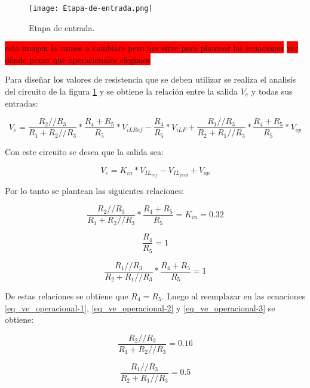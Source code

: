 \begin{figure}[H]
	\centering
	\texttt{[image: Etapa-de-entrada.png]}
	\caption{Etapa de entrada.}
	\label{fig:img_etapa-de-entrada}
\end{figure}
\colorbox{red}{esta imagen la vamos a cambiare pero nos sirve para plantear las ecuaciones}
\colorbox{red}{ver dónde poner qué operacionales elegimos}

Para diseñar los valores de resistencia que se deben utilizar se realiza el analisis del circuito de la figura \ref{fig:img_etapa-de-entrada} y se obtiene la relación entre la salida $V_e$ y todas sus entradas:

\begin{equation*}
	V_e = \frac{R_{2}//R_{3}}{R_{1}+R_{2}//R_{3}}*\frac{R_{4}+R_{5}}{R_{5}}*V_{iLRef}-\frac{R_{4}}{R_{5}}*V_{iLF}+\frac{R_{1}//R_{3}}{R_{2}+R_{1}//R_{3}}*\frac{R_{4}+R_{5}}{R_{5}}* V_{op}
\end{equation*}

Con este circuito se desea que la salida sea:

\begin{equation}
	V_e = K_{in} * V_{IL_{ref}} - V_{IL_{feed}} + V_{op}
\end{equation}

Por lo tanto se plantean las siguientes relaciones:

\begin{equation} \label{eq_ve_operacional-1}
	\frac{R_{2}//R_{3}}{R_{1}+R_{2}//R_{3}}*\frac{R_{4}+R_{5}}{R_{5}} = K_{in} = 0.32
\end{equation}

\begin{equation} \label{eq_ve_operacional-2}
	\frac{R_{4}}{R_{5}} = 1
\end{equation}

\begin{equation} \label{eq_ve_operacional-3}
	\frac{R_{1}//R_{3}}{R_{2}+R_{1}//R_{3}}*\frac{R_{4}+R_{5}}{R_{5}} = 1
\end{equation}

De estas relaciones se obtiene que $R_{4}=R_{5}$. Luego al reemplazar en las ecuaciones \ref{eq_ve_operacional-1}, \ref{eq_ve_operacional-2} y \ref{eq_ve_operacional-3} se obtiene:

\begin{equation*}
	\frac{R_{2}//R_{3}}{R_{1}+R_{2}//R_{3}}= 0.16
\end{equation*}

\begin{equation*}
	\frac{R_{1}//R_{3}}{R_{2}+R_{1}//R_{3}}= 0.5
\end{equation*}

